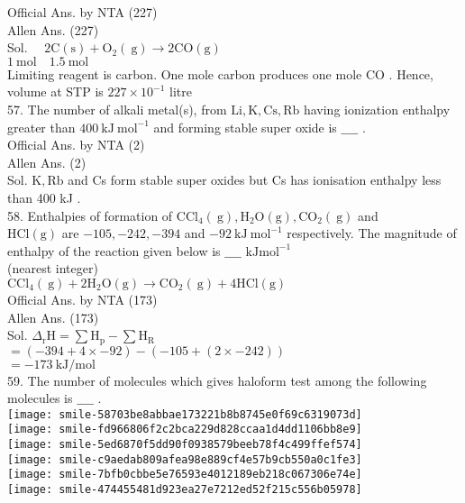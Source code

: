 \documentclass[10pt]{article}
\begin{document}
Official Ans. by NTA (227)\\
Allen Ans. (227)\\
Sol. \(\quad 2 \mathrm{C}(\mathrm{s})+\mathrm{O}_{2}(\mathrm{~g}) \rightarrow 2 \mathrm{CO}(\mathrm{g})\)\\
\(1 \mathrm{~mol} \quad 1.5 \mathrm{~mol}\)\\
Limiting reagent is carbon. One mole carbon produces one mole CO . Hence, volume at STP is \(227 \times 10^{-1}\) litre\\
57. The number of alkali metal(s), from \(\mathrm{Li}, \mathrm{K}, \mathrm{Cs}, \mathrm{Rb}\) having ionization enthalpy greater than \(400 \mathrm{~kJ} \mathrm{~mol}^{-1}\) and forming stable super oxide is \(\_\_\_\_\) .\\
Official Ans. by NTA (2)\\
Allen Ans. (2)\\
Sol. \(\mathrm{K}, \mathrm{Rb}\) and Cs form stable super oxides but Cs has ionisation enthalpy less than 400 kJ .\\
58. Enthalpies of formation of \(\mathrm{CCl}_{4}(\mathrm{~g}), \mathrm{H}_{2} \mathrm{O}(\mathrm{g}), \mathrm{CO}_{2}(\mathrm{~g})\) and\\
\(\mathrm{HCl}(\mathrm{g})\) are \(-105,-242,-394\) and \(-92 \mathrm{~kJ} \mathrm{~mol}^{-1}\) respectively. The magnitude of enthalpy of the reaction given below is \(\_\_\_\_\) \(\mathrm{kJ} \mathrm{mol}^{-1}\)\\
(nearest integer)\\
\(\mathrm{CCl}_{4}(\mathrm{~g})+2 \mathrm{H}_{2} \mathrm{O}(\mathrm{g}) \rightarrow \mathrm{CO}_{2}(\mathrm{~g})+4 \mathrm{HCl}(\mathrm{g})\)\\
Official Ans. by NTA (173)\\
Allen Ans. (173)\\
Sol. \(\Delta_{\mathrm{r}} \mathrm{H}=\sum \mathrm{H}_{\mathrm{p}}-\sum \mathrm{H}_{\mathrm{R}}\)\\
\(=(-394+4 \times-92)-(-105+(2 \times-242))\)\\
\(=-173 \mathrm{~kJ} / \mathrm{mol}\)\\
59. The number of molecules which gives haloform test among the following molecules is \(\_\_\_\_\) .\\
\texttt{[image: smile-58703be8abbae173221b8b8745e0f69c6319073d]}\\
\texttt{[image: smile-fd966806f2c2bca229d828ccaa1d4dd1106bb8e9]}\\
\texttt{[image: smile-5ed6870f5dd90f0938579beeb78f4c499ffef574]}\\
\texttt{[image: smile-c9aedab809afea98e889cf4e57b9cb550a0c1fe3]}\\
\texttt{[image: smile-7bfb0cbbe5e76593e4012189eb218c067306e74e]}\\
\texttt{[image: smile-474455481d923ea27e7212ed52f215c556b05978]}
\end{document}
